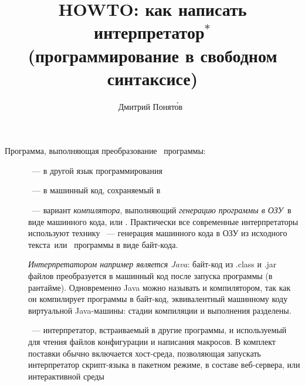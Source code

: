 
\author{Дмитрий Понят\'{о}в\ }
\title{HOWTO: как написать интерпретатор$^*$\\(программирование в свободном синтаксисе)}
\secdown
\maketitle
\tableofcontents


Программа, выполняющая преобразование
\ программы:
\begin{description}
	\item[]\label{translator}\ ---
		в другой язык программирования
	\item[]\label{compiler}\ ---
		в машинный код, сохраняемый в 
	\item[]\label{interpreter}\ ---
		вариант \emph{компилятора}, выполняющий \emph{генерацию программы в
		ОЗУ}\ в виде машинного
		кода, или .
		Практически все современные интерпретаторы используют технику
		\ --- генерация машинного кода
		в ОЗУ из исходного текста\ или \ программы в виде
		байт-кода.
		
		\emph{Интерпретатором например является
		Java}:
		байт-код из .class и .jar файлов преобразуется в машинный код
		после запуска программы (в рантайме). Одновременно Java можно называть
		и компилятором, так как он компилирует программы в байт-код,
		эквивалентный машинному коду виртуальной Java-машины: стадии компиляции
		и выполнения разделены.
	\item[]\label{script}\ ---
		интерпретатор, встраиваемый в другие программы, и используемый
		для чтения файлов конфигурации и написания макросов. В комплект поставки
		обычно включается хост-среда, позволяющая запускать интерпретатор
		скрипт-языка в пакетном режиме,
		в составе веб-сервера, или интерактивной среды
\end{description}

